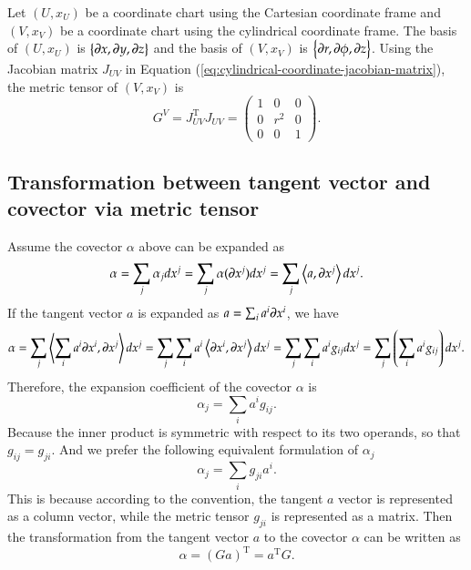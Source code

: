 \documentclass[11pt, a4paper]{book}
\begin{document}
\begin{Example}
  \label{exam:cylindrical-coordinate-metric-tensor}
  Let $(U,x_U)$ be a coordinate chart using the Cartesian coordinate frame and $(V,x_V)$
  be a coordinate chart using the cylindrical coordinate frame. The basis of $(U,x_U)$ is
  $\left\{ \boldsymbol{\partial}x, \boldsymbol{\partial}y, \boldsymbol{\partial}z \right\}$ and the basis of
  $(V,x_V)$ is $\left\{ \boldsymbol{\partial}r, \boldsymbol{\partial}\phi, \boldsymbol{\partial}z \right\}$. Using
  the Jacobian matrix $J_{UV}$ in Equation (\ref{eq:cylindrical-coordinate-jacobian-matrix}), the metric
  tensor of $(V,x_V)$ is
  \begin{equation}
    \label{eq:cylindrical-coordinate-metric-tensor}
    G^V = J_{UV}^{\mathrm{T}}J_{UV} = \begin{pmatrix}
      1 & 0 & 0 \\
      0 & r^2 & 0 \\
      0 & 0 & 1
    \end{pmatrix}.
  \end{equation}
\end{Example}

\subsection{Transformation between tangent vector and covector via metric tensor}

Assume the covector $\alpha$ above can be expanded as
\begin{equation*}
  \alpha = \sum_j \alpha_j dx^j = \sum_j \alpha(\boldsymbol{\partial}x^j) dx^j = \sum_j
  \left\langle a, \boldsymbol{\partial}x^j \right\rangle dx^j.
\end{equation*}
If the tangent vector $a$ is expanded as $a = \sum_i a^i \boldsymbol{\partial}x^i$, we have
\begin{equation*}
  \alpha = \sum_j \left\langle \sum_i a^i \boldsymbol{\partial}x^i, \boldsymbol{\partial}x^j \right\rangle
  dx^j = \sum_j\sum_i a^i \left\langle \boldsymbol{\partial}x^i, \boldsymbol{\partial}x^j \right\rangle
  dx^j = \sum_j\sum_i a^i g_{ij} dx^j = \sum_j \left( \sum_i a^i g_{ij} \right) dx^j.
\end{equation*}
Therefore, the expansion coefficient of the covector $\alpha$ is
\begin{equation}
  \alpha_j = \sum_i a^i g_{ij}.
\end{equation}
Because the inner product is symmetric with respect to its two operands, so that $g_{ij} = g_{ji}$.
And we prefer the following equivalent formulation of $\alpha_j$
\begin{equation}
  \alpha_j = \sum_i g_{ji} a^i.
\end{equation}
This is because according to the convention, the tangent $a$ vector is represented as a
column vector, while the metric tensor $g_{ji}$ is represented as a matrix. Then the
transformation from the tangent vector $a$ to the covector $\alpha$ can be written as
\begin{equation}
  \alpha = (G a)^{\mathrm{T}} = a^{\mathrm{T}} G.
\end{equation}
\end{document}
